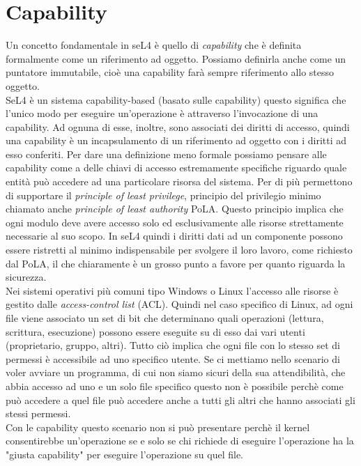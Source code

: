 \section{Capability}
Un concetto fondamentale in seL4 è quello di \textit{capability} che è definita formalmente come un riferimento ad oggetto. Possiamo definirla anche come un puntatore immutabile, cioè una capability farà sempre riferimento allo stesso oggetto.\\
SeL4 è un sistema capability-based (basato sulle capability) questo significa che l'unico modo per eseguire un'operazione è attraverso l'invocazione di una capability. Ad ognuna di esse, inoltre, sono associati dei diritti di accesso, quindi una capability è un incapsulamento di un riferimento ad oggetto con i diritti ad esso conferiti.
Per dare una definizione meno formale possiamo pensare alle capability come a delle chiavi di accesso estremamente specifiche riguardo quale entità può accedere ad una particolare risorsa del sistema. Per di più permettono di supportare il \textit{principle of least privilege}, principio del privilegio minimo chiamato anche \textit{principle of least authority} PoLA. Questo principio implica che ogni modulo deve avere accesso solo ed esclusivamente alle risorse strettamente necessarie al suo scopo.
In seL4 quindi i diritti dati ad un componente possono essere ristretti al minimo indispensabile per svolgere il loro lavoro, come richiesto dal PoLA, il che chiaramente è un grosso punto a favore per quanto riguarda la sicurezza.\\
Nei sistemi operativi più comuni tipo Windows o Linux l'accesso alle risorse è gestito dalle \textit{access-control list} (ACL). Quindi nel caso specifico di Linux, ad ogni file viene associato un set di bit che determinano quali operazioni (lettura, scrittura, esecuzione) possono essere eseguite su di esso dai vari utenti (proprietario, gruppo, altri). Tutto ciò implica che ogni file con lo stesso set di permessi è accessibile ad uno specifico utente. Se ci mettiamo nello scenario di voler avviare un programma, di cui non siamo sicuri della sua attendibilità, che abbia accesso ad uno e un solo file specifico questo non è possibile perchè come può accedere a quel file può accedere anche a tutti gli altri che hanno associati gli stessi permessi.\\
Con le capability questo scenario non si può presentare perchè il kernel consentirebbe un'operazione se e solo se chi richiede di eseguire l'operazione ha la "giusta capability" per eseguire l'operazione su quel file. 

